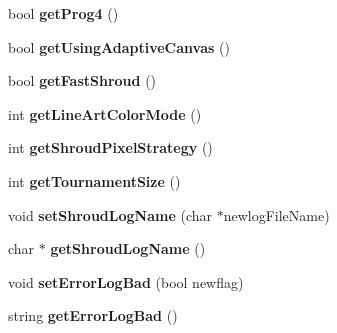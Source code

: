 \begin{DoxyCompactItemize}
\item 
\hypertarget{class_config_reader_a73b004a202d836b0f5947675529dbb4c}{bool {\bfseries get\-Prog4} ()}\label{class_config_reader_a73b004a202d836b0f5947675529dbb4c}

\item 
\hypertarget{class_config_reader_ac33a1ec754771eb38d945e312493fc70}{bool {\bfseries get\-Using\-Adaptive\-Canvas} ()}\label{class_config_reader_ac33a1ec754771eb38d945e312493fc70}

\item 
\hypertarget{class_config_reader_ad2722e1f259e6a4e46b5dc0166fdf80d}{bool {\bfseries get\-Fast\-Shroud} ()}\label{class_config_reader_ad2722e1f259e6a4e46b5dc0166fdf80d}

\item 
\hypertarget{class_config_reader_a16ec9fa2175b2c7f28253ca3ec05c2da}{int {\bfseries get\-Line\-Art\-Color\-Mode} ()}\label{class_config_reader_a16ec9fa2175b2c7f28253ca3ec05c2da}

\item 
\hypertarget{class_config_reader_a8b50213030f7964d77e8989f8ee6c5e4}{int {\bfseries get\-Shroud\-Pixel\-Strategy} ()}\label{class_config_reader_a8b50213030f7964d77e8989f8ee6c5e4}

\item 
\hypertarget{class_config_reader_ac48c38cb4fd2d04c7761b4813d94cd90}{int {\bfseries get\-Tournament\-Size} ()}\label{class_config_reader_ac48c38cb4fd2d04c7761b4813d94cd90}

\item 
\hypertarget{class_config_reader_aaf1d7c03b3b4b3e71e12e6161b09db34}{void {\bfseries set\-Shroud\-Log\-Name} (char $\ast$newlog\-File\-Name)}\label{class_config_reader_aaf1d7c03b3b4b3e71e12e6161b09db34}

\item 
\hypertarget{class_config_reader_ac5df2afab92273c5a69c61fb8ffc9355}{char $\ast$ {\bfseries get\-Shroud\-Log\-Name} ()}\label{class_config_reader_ac5df2afab92273c5a69c61fb8ffc9355}

\item 
\hypertarget{class_config_reader_a7bf5f509fd6103cf351c384ddde32149}{void {\bfseries set\-Error\-Log\-Bad} (bool newflag)}\label{class_config_reader_a7bf5f509fd6103cf351c384ddde32149}

\item 
\hypertarget{class_config_reader_a5b5baa8c5865fd75f87d3fe69dc2f814}{string {\bfseries get\-Error\-Log\-Bad} ()}\label{class_config_reader_a5b5baa8c5865fd75f87d3fe69dc2f814}

\end{DoxyCompactItemize}
